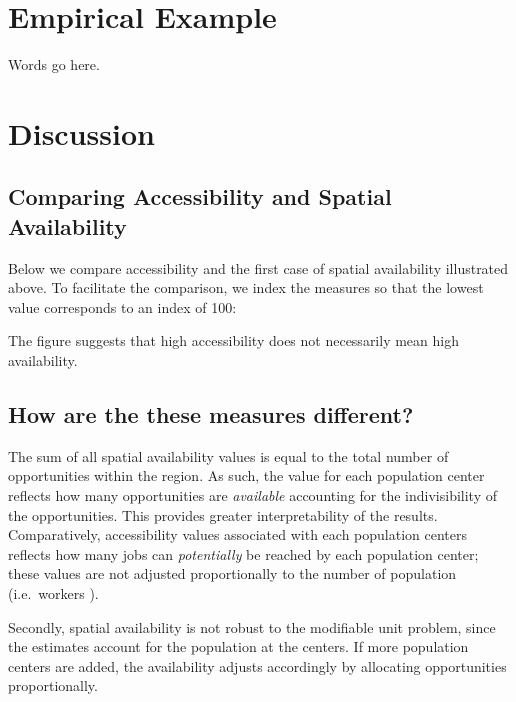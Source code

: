 \documentclass[]{elsarticle} %
\begin{document}
\hypertarget{empirical-example}{%
\section{Empirical Example}\label{empirical-example}}

Words go here.

\hypertarget{discussion}{%
\section{Discussion}\label{discussion}}

\hypertarget{comparing-accessibility-and-spatial-availability}{%
\subsection{Comparing Accessibility and Spatial
Availability}\label{comparing-accessibility-and-spatial-availability}}

Below we compare accessibility and the first case of spatial
availability illustrated above. To facilitate the comparison, we index
the measures so that the lowest value corresponds to an index of 100:

The figure suggests that high accessibility does not necessarily mean
high availability.

\hypertarget{how-are-the-these-measures-different}{%
\subsection{How are the these measures
different?}\label{how-are-the-these-measures-different}}

The sum of all spatial availability values is equal to the total number
of opportunities within the region. As such, the value for each
population center reflects how many opportunities are \emph{available}
accounting for the indivisibility of the opportunities. This provides
greater interpretability of the results. Comparatively, accessibility
values associated with each population centers reflects how many jobs
can \emph{potentially} be reached by each population center; these
values are not adjusted proportionally to the number of population
(i.e.~workers ).

Secondly, spatial availability is not robust to the modifiable unit
problem, since the estimates account for the population at the centers.
If more population centers are added, the availability adjusts
accordingly by allocating opportunities proportionally.
\end{document}

